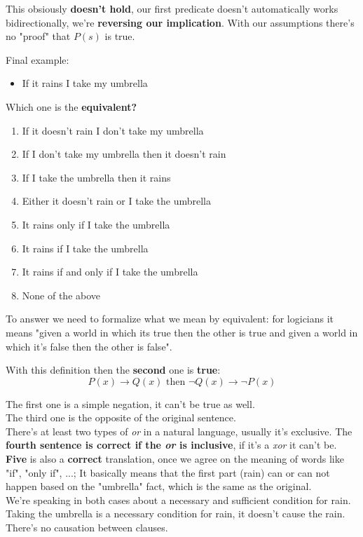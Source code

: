 	This obsiously \textbf{doesn't hold}, our first predicate doesn't automatically works bidirectionally, we're \textbf{reversing our implication}. With our assumptions there's no "proof" that $P(s)$ is true.

	\begin{example} Final example:
	\begin{itemize}
		\item If it rains I take my umbrella
	\end{itemize}
	\end{example}

	Which one is the \textbf{equivalent?}
	\begin{enumerate}
		\item If it doesn't rain I don't take my umbrella
		\item If I don't take my umbrella then it doesn't rain
		\item If I take the umbrella then it rains
		\item Either it doesn't rain or I take the umbrella
		\item It rains only if I take the umbrella
		\item It rains if I take the umbrella
		\item It rains if and only if I take the umbrella
		\item None of the above
	\end{enumerate}

	To answer we need to formalize what we mean by equivalent: for logicians it means "given a world in which its true then the other is true and given a world in which it's false then the other is false". \\

	\newpage

	With this definition then the \textbf{second} one is \textbf{true}:
	$$ P(x) \rightarrow Q(x) \text{ then } \neg Q(x) \rightarrow \neg P(x) $$

	The first one is a simple negation, it can't be true as well. \\

	The third one is the opposite of the original sentence. \\

	There's at least two types of \textit{or} in a natural language, usually it's exclusive. The \textbf{fourth sentence is correct if the \textit{or} is inclusive}, if it's a \textit{xor} it can't be. \\

	\textbf{Five} is also a \textbf{correct} translation, once we agree on the meaning of words like "if", "only if", ...; It basically means that the first part (rain) can or can not happen based on the "umbrella" fact, which is the same as the original. \\
	We're speaking in both cases about a necessary and sufficient condition for rain. Taking the umbrella is a necessary condition for rain, it doesn't cause the rain. There's no causation between clauses. \\

